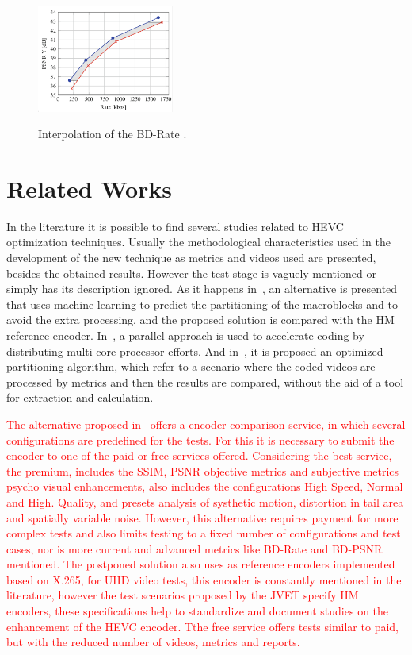 \documentclass[journal]{IEEEtran}
\begin{document}
\FloatBarrier
\begin{figure}[!ht]
	\centering
	\caption{Interpolation of the BD-Rate \cite{Mathias}.}
	\includegraphics[width=0.4\textwidth]{figures/chartbdrate.png}
	\label{fig:chart_barate}
\end{figure}
\FloatBarrier
	

\section{Related Works}


In the literature it is possible to find several studies related to HEVC optimization techniques. Usually the methodological characteristics used in the development of the new technique as metrics and videos used are presented, besides the obtained results. However the test stage is vaguely mentioned or simply has its description ignored. As it happens in~\cite{oliveira:16}, an alternative is presented that uses machine learning to predict the partitioning of the macroblocks and to avoid the extra processing, and the proposed solution is compared with the HM reference encoder. In~\cite{Wang:16}, a parallel approach is used to accelerate coding by distributing multi-core processor efforts. And in~\cite{wang:13}, it is proposed an optimized partitioning algorithm, which refer to a scenario where the coded videos are processed by metrics and then the results are compared, without the aid of a tool for extraction and calculation.


\textcolor{red}{ The alternative proposed in~\cite{msu:16} offers a encoder comparison service, in which several configurations are predefined for the tests. For this it is necessary to submit the encoder to one of the paid or free services offered. Considering the best service, the premium, includes the SSIM, PSNR objective metrics and subjective metrics psycho visual enhancements, also includes the configurations High Speed, Normal and High. Quality, and presets analysis of systhetic motion, distortion in tail area and spatially variable noise. However, this alternative requires payment for more complex tests and also limits testing to a fixed number of configurations and test cases, nor is more current and advanced metrics like BD-Rate and BD-PSNR mentioned. The postponed solution also uses as reference encoders implemented based on X.265, for UHD video tests, this encoder is constantly mentioned in the literature, however the test scenarios proposed by the JVET specify HM encoders, these specifications help to standardize and document studies on the enhancement of the HEVC encoder. Tthe free service offers tests similar to paid, but with the reduced number of videos, metrics and reports.
}
\end{document}
